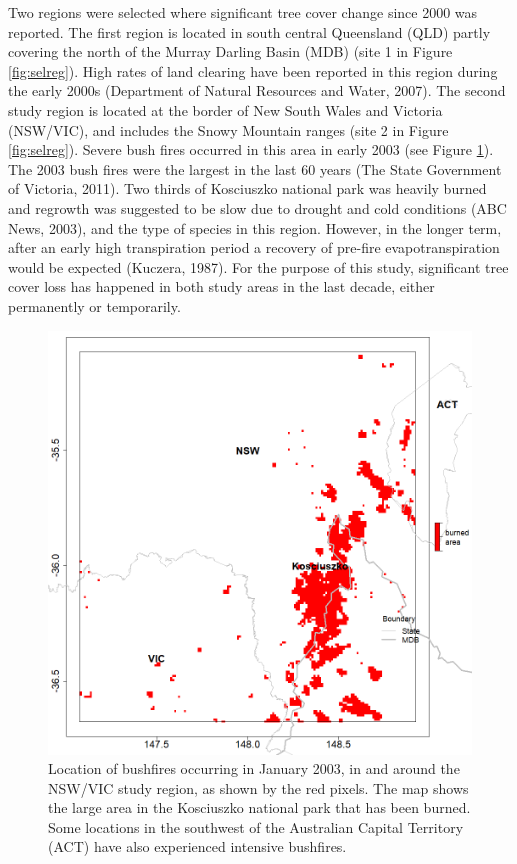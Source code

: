 \documentclass[fleqn,10pt,lineno]{wlpeerj} %
\theoremstyle{definition}
\theoremstyle{definition}
\theoremstyle{definition}
\theoremstyle{remark}
\begin{document}
Two regions were selected where significant tree cover change since 2000
was reported. The first region is located in south central Queensland
(QLD) partly covering the north of the Murray Darling Basin (MDB) (site
1 in Figure \ref{fig:selreg}). High rates of land clearing have been
reported in this region during the early 2000s (Department of Natural
Resources and Water, 2007). The second study region is located at the
border of New South Wales and Victoria (NSW/VIC), and includes the Snowy
Mountain ranges (site 2 in Figure \ref{fig:selreg}). Severe bush fires
occurred in this area in early 2003 (see Figure \ref{fig:bushfire}). The
2003 bush fires were the largest in the last 60 years (The State
Government of Victoria, 2011). Two thirds of Kosciuszko national park
was heavily burned and regrowth was suggested to be slow due to drought
and cold conditions (ABC News, 2003), and the type of species in this
region. However, in the longer term, after an early high transpiration
period a recovery of pre-fire evapotranspiration would be expected
(Kuczera, 1987). For the purpose of this study, significant tree cover
loss has happened in both study areas in the last decade, either
permanently or temporarily.

\begin{figure}
\includegraphics[width=0.9\linewidth]{figures/Fig2} \caption{Location of bushfires occurring in January 2003, in and around the NSW/VIC study region, as shown by the red pixels. The map shows the large area in the Kosciuszko national park that has been burned. Some locations in the southwest of the Australian Capital Territory (ACT) have also experienced intensive bushfires.}\label{fig:bushfire}
\end{figure}
\end{document}
